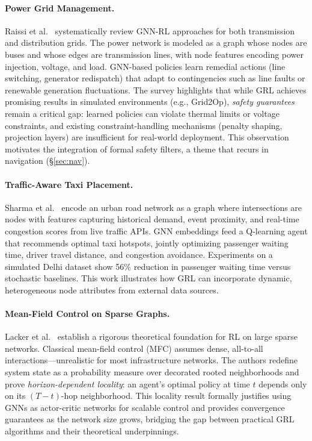 \documentclass{article}
\begin{document}
\paragraph{Power Grid Management.}
Raissi et al.~\cite{grl_power2025} systematically review GNN-RL approaches for both transmission and distribution grids. The power network is modeled as a graph whose nodes are buses and whose edges are transmission lines, with node features encoding power injection, voltage, and load. GNN-based policies learn remedial actions (line switching, generator redispatch) that adapt to contingencies such as line faults or renewable generation fluctuations. The survey highlights that while GRL achieves promising results in simulated environments (e.g., Grid2Op), \emph{safety guarantees} remain a critical gap: learned policies can violate thermal limits or voltage constraints, and existing constraint-handling mechanisms (penalty shaping, projection layers) are insufficient for real-world deployment. This observation motivates the integration of formal safety filters, a theme that recurs in navigation (\S\ref{sec:nav}).

\paragraph{Traffic-Aware Taxi Placement.}
Sharma et al.~\cite{taxi2026} encode an urban road network as a graph where intersections are nodes with features capturing historical demand, event proximity, and real-time congestion scores from live traffic APIs. GNN embeddings feed a Q-learning agent that recommends optimal taxi hotspots, jointly optimizing passenger waiting time, driver travel distance, and congestion avoidance. Experiments on a simulated Delhi dataset show 56\% reduction in passenger waiting time versus stochastic baselines. This work illustrates how GRL can incorporate dynamic, heterogeneous node attributes from external data sources.

\paragraph{Mean-Field Control on Sparse Graphs.}
Lacker et al.~\cite{mfc_sparse2026} establish a rigorous theoretical foundation for RL on large sparse networks. Classical mean-field control (MFC) assumes dense, all-to-all interactions---unrealistic for most infrastructure networks. The authors redefine system state as a probability measure over decorated rooted neighborhoods and prove \emph{horizon-dependent locality}: an agent's optimal policy at time $t$ depends only on its $(T{-}t)$-hop neighborhood. This locality result formally justifies using GNNs as actor-critic networks for scalable control and provides convergence guarantees as the network size grows, bridging the gap between practical GRL algorithms and their theoretical underpinnings.
\end{document}
